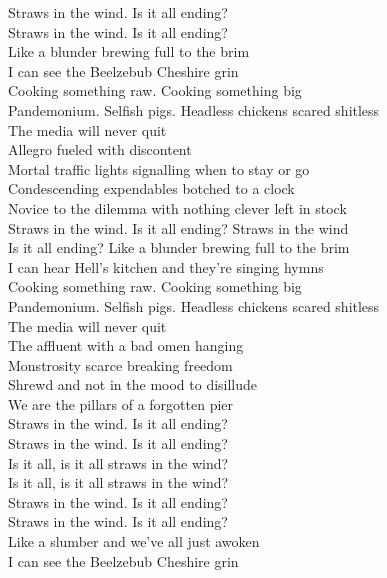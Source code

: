 Straws in the wind. Is it all ending? \\
Straws in the wind. Is it all ending? \\
Like a blunder brewing full to the brim \\
I can see the Beelzebub Cheshire grin \\

Cooking something raw. Cooking something big \\
Pandemonium. Selfish pigs. Headless chickens scared shitless \\
The media will never quit \\

Allegro fueled with discontent \\
Mortal traffic lights signalling when to stay or go \\
Condescending expendables botched to a clock \\
Novice to the dilemma with nothing clever left in stock \\

Straws in the wind. Is it all ending? Straws in the wind \\
Is it all ending? Like a blunder brewing full to the brim \\
I can hear Hell's kitchen and they're singing hymns \\

Cooking something raw. Cooking something big \\
Pandemonium. Selfish pigs. Headless chickens scared shitless \\
The media will never quit \\

The affluent with a bad omen hanging \\
Monstrosity scarce breaking freedom \\
Shrewd and not in the mood to disillude \\
We are the pillars of a forgotten pier \\

Straws in the wind. Is it all ending? \\
Straws in the wind. Is it all ending? \\
Is it all, is it all straws in the wind? \\
Is it all, is it all straws in the wind? \\

Straws in the wind. Is it all ending? \\
Straws in the wind. Is it all ending? \\
Like a slumber and we've all just awoken \\
I can see the Beelzebub Cheshire grin \\

